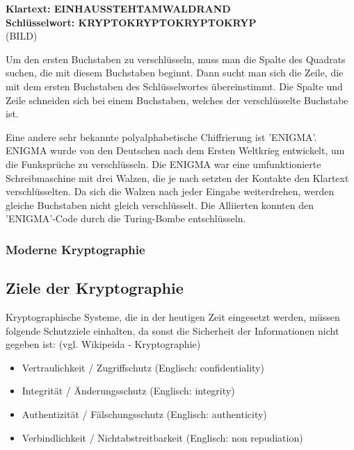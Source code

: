 \documentclass[12pt,a4paper]{report}
\begin{document}
\textbf{Klartext:      EINHAUSSTEHTAMWALDRAND}\\
\textbf{Schlüsselwort: KRYPTOKRYPTOKRYPTOKRYP}\\

(BILD)

Um den ersten Buchstaben zu verschlüsseln, muss man die Spalte des Quadrats suchen, die mit diesem Buchstaben beginnt. Dann sucht man sich die Zeile, die mit dem ersten Buchstaben des Schlüsselwortes übereinstimmt. Die Spalte und Zeile schneiden sich bei einem Buchstaben, welches der verschlüsselte Buchstabe ist.

Eine andere sehr bekannte polyalphabetische Chiffrierung ist 'ENIGMA'. ENIGMA wurde von den Deutschen nach dem Ersten Weltkrieg entwickelt, um die Funksprüche zu verschlüsseln. Die ENIGMA war eine umfunktionierte Schreibmaschine mit drei Walzen, die je nach setzten der Kontakte den Klartext verschlüsselten. Da sich die Walzen nach jeder Eingabe weiterdrehen, werden gleiche Buchstaben nicht gleich verschlüsselt. Die Alliierten konnten den 'ENIGMA'-Code durch die Turing-Bombe entschlüsseln.

\subsubsection{Moderne Kryptographie}

\subsection{Ziele der Kryptographie}

Kryptographische Systeme, die in der heutigen Zeit eingesetzt werden, müssen folgende Schutzziele einhalten, da sonst die Sicherheit der Informationen nicht gegeben ist: (vgl. Wikipeida - Kryptographie)

\begin{itemize}
\item Vertraulichkeit / Zugriffschutz (Englisch: confidentiality)
\item Integrität / Änderungsschutz  (Englisch: integrity) 
\item Authentizität / Fälschungsschutz (Englisch: authenticity)
\item Verbindlichkeit / Nichtabstreitbarkeit (Englisch: non repudiation) 
\end{itemize}
\end{document}
